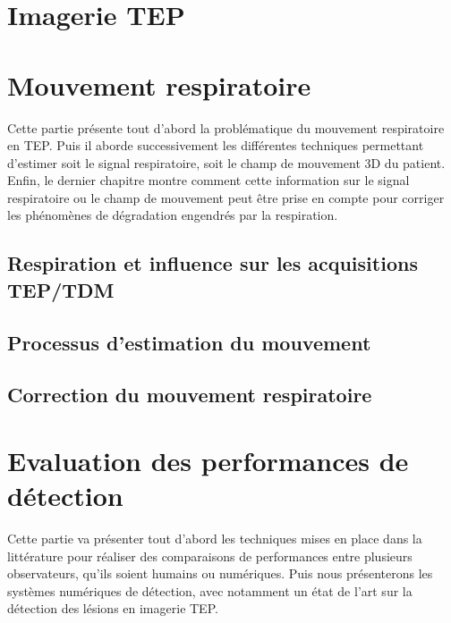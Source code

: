\documentclass[12pt, twoside, a4paper]{book}
\begin{document}
 \listoffigures

 \listoftables

\newpage



\part{Imagerie TEP}
		
			
\part{Mouvement respiratoire}
Cette partie présente tout d'abord la problématique du mouvement respiratoire en TEP. Puis il aborde successivement les différentes techniques permettant d'estimer soit le signal respiratoire, soit le champ de mouvement 3D du patient. Enfin, le dernier chapitre montre comment cette information sur le signal respiratoire ou le champ de mouvement peut être prise en compte pour corriger les phénomènes de dégradation engendrés par la respiration.

	\chapter{Respiration et influence sur les acquisitions TEP/TDM}
	
	
	\chapter{Processus d'estimation du mouvement}
	
	
	\chapter{Correction du mouvement respiratoire}
	

\part{Evaluation des performances de détection}
Cette partie va présenter tout d'abord les techniques mises en place dans la littérature pour réaliser des comparaisons de performances entre plusieurs observateurs, qu’ils soient humains ou numériques. Puis nous présenterons les systèmes numériques de détection, avec notamment un état de l'art  sur la détection des lésions en imagerie TEP. 
\end{document}
